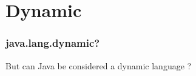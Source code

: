 
\section{Dynamic}

\begin{frame}
  \frametitle{java.lang.dynamic?}

  But can Java be considered a dynamic language ? 
\end{frame}
